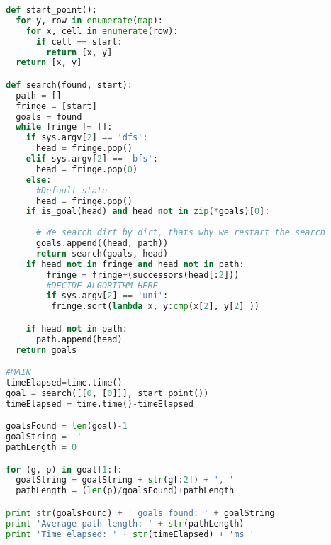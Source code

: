 \documentclass{scrreprt}
\begin{document}
\begin{appendices}
\begin{lstlisting}[language=Python]
def start_point():
  for y, row in enumerate(map):
    for x, cell in enumerate(row):
      if cell == start:
        return [x, y]
  return [x, y]

def search(found, start):
  path = []
  fringe = [start]
  goals = found
  while fringe != []:
    if sys.argv[2] == 'dfs':
      head = fringe.pop()
    elif sys.argv[2] == 'bfs':
      head = fringe.pop(0)
    else:
      #Default state
      head = fringe.pop()
    if is_goal(head) and head not in zip(*goals)[0]:
      
      # We search dirt by dirt, thats why we restart the search
      goals.append((head, path))
      return search(goals, head)
    if head not in fringe and head not in path:
        fringe = fringe+(successors(head[:2]))
        #DECIDE ALGORITHM HERE
        if sys.argv[2] == 'uni':
         fringe.sort(lambda x, y:cmp(x[2], y[2] ))

    if head not in path:
      path.append(head)
  return goals

#MAIN
timeElapsed=time.time()
goal = search([[0, [0]]], start_point())
timeElapsed = time.time()-timeElapsed

goalsFound = len(goal)-1
goalString = ''
pathLength = 0

for (g, p) in goal[1:]:
  goalString = goalString + str(g[:2]) + ', '
  pathLength = (len(p)/goalsFound)+pathLength

print str(goalsFound) + ' goals found: ' + goalString
print 'Average path length: ' + str(pathLength)
print 'Time elapsed: ' + str(timeElapsed) + 'ms '         
\end{lstlisting}
\end{appendices}
\end{document}
